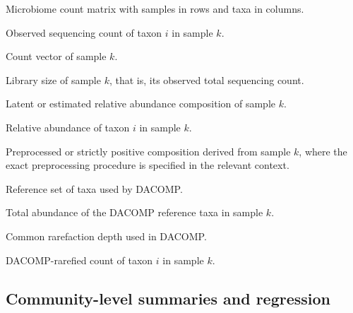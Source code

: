 \notationsettings{3.5cm}
\begin{notationlist}
	\item[$\mathbf{X} = (x_{ki}) \in \mathbb{N}_0^{n \times p}$] Microbiome count matrix with samples in rows and taxa in columns.
	
	\item[$x_{ki}$] Observed sequencing count of taxon $i$ in sample $k$.
	
	\item[$\mathbf{x}_k = (x_{k1},\ldots,x_{kp})^\top$] Count vector of sample $k$.
	
	\item[$m_k = \sum_{i=1}^{p} x_{ki}$] Library size of sample $k$, that is, its observed total sequencing count.
	
	\item[$\mathbf{z}_k = (z_{k1},\ldots,z_{kp})^\top$] Latent or estimated relative abundance composition of sample $k$.
	
	\item[$z_{ki}$] Relative abundance of taxon $i$ in sample $k$.
	
	\item[$\mathbf{x}_k^\ast$] Preprocessed or strictly positive composition derived from sample $k$, where the exact preprocessing procedure is specified in the relevant context.
	
	\item[$\mathcal{B}$] Reference set of taxa used by DACOMP.
	
	\item[$R_k$] Total abundance of the DACOMP reference taxa in sample $k$.
	
	\item[$\lambda$] Common rarefaction depth used in DACOMP.
	
	\item[$Z_{ki}$] DACOMP-rarefied count of taxon $i$ in sample $k$.
\end{notationlist}

\subsection*{Community-level summaries and regression}

